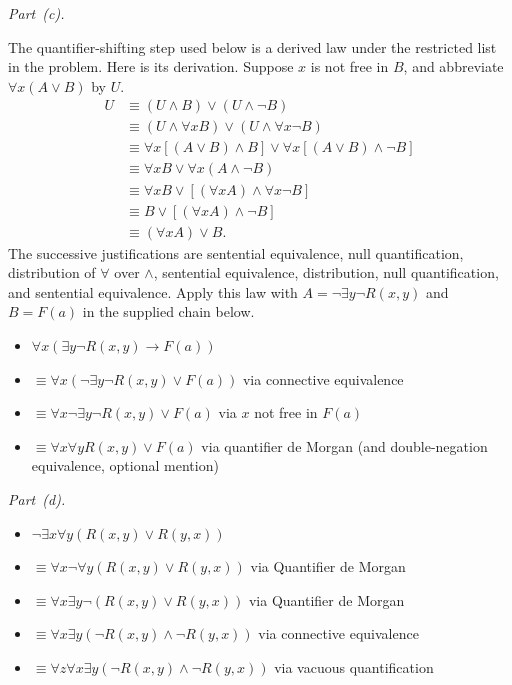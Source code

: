 \documentclass[11pt,letterpaper,oneside,openany]{book}
\newcounter{problem}[chapter]
\begin{document}
\par\medskip\noindent\textit{Part~(c).}\par\nobreak
The quantifier-shifting step used below is a derived law under the restricted list in the problem. Here is its derivation. Suppose $x$ is not free in $B$, and abbreviate $\forall x(A\lor B)$ by $U$.
\begin{align*}
U &\equiv (U\land B)\lor(U\land\neg B)\\
&\equiv (U\land\forall x B)\lor(U\land\forall x\neg B)\\
&\equiv \forall x[(A\lor B)\land B]\lor\forall x[(A\lor B)\land\neg B]\\
&\equiv \forall x B\lor\forall x(A\land\neg B)\\
&\equiv \forall x B\lor[(\forall x A)\land\forall x\neg B]\\
&\equiv B\lor[(\forall x A)\land\neg B]\\
&\equiv (\forall x A)\lor B.
\end{align*}
The successive justifications are sentential equivalence, null quantification, distribution of $\forall$ over $\land$, sentential equivalence, distribution, null quantification, and sentential equivalence. Apply this law with $A=\neg\exists y\neg R(x,y)$ and $B=F(a)$ in the supplied chain below.
\begin{itemize}
        \item $\forall x (\exists y \neg R(x,y) \to F(a))$
        \item $\equiv \forall x (\neg \exists y \neg R(x,y) \vee F(a))$ via connective equivalence
        \item $\equiv \forall x \neg \exists y \neg R(x,y) \vee F(a)$ via $x$ not free in $F(a)$
        \item $\equiv \forall x \forall y R(x,y) \vee F(a)$ via quantifier de Morgan (and double-negation equivalence, optional mention)
    \end{itemize}

\par\medskip\noindent\textit{Part~(d).}\par\nobreak
\begin{itemize}
        \item $\neg \exists x \forall y (R(x,y) \vee R(y,x))$
        \item $\equiv \forall x \neg \forall y (R(x,y) \vee R(y,x))$ via Quantifier de Morgan
        \item $\equiv \forall x \exists y \neg (R(x,y) \vee R(y,x))$ via Quantifier de Morgan
        \item $\equiv \forall x \exists y (\neg R(x,y) \wedge \neg R(y,x))$ via connective equivalence
        \item $\equiv \forall z \forall x \exists y (\neg R(x,y) \wedge \neg R(y,x))$ via vacuous quantification
    \end{itemize}
\end{document}
